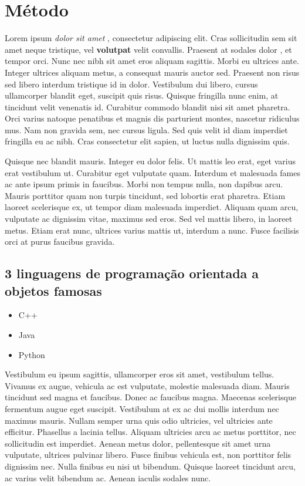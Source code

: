 \section{Método}
{ \LARGE 
    Lorem ipsum \textit{ dolor sit amet }
}, consectetur adipiscing elit. 
Cras sollicitudin sem sit amet neque tristique, vel \textbf{ volutpat } velit convallis. 
{ \footnotesize Praesent at sodales dolor }, et tempor orci. 
Nunc nec nibh sit { \Large amet eros } aliquam sagittis. 
{ \ttfamily
Morbi eu ultrices ante. Integer ultrices aliquam metus, a consequat mauris auctor sed.
}
Praesent non risus sed libero interdum tristique id in dolor. 
Vestibulum dui libero, cursus ullamcorper blandit eget, suscipit quis risus. 
Quisque fringilla nunc enim, at tincidunt velit venenatis id. 
Curabitur commodo blandit nisi sit amet pharetra. 
Orci varius natoque penatibus et magnis dis parturient montes, nascetur ridiculus mus. 
Nam non gravida sem, nec cursus ligula. Sed quis velit id diam imperdiet fringilla eu ac nibh. 
Cras consectetur elit sapien, ut luctus nulla dignissim quis.

Quisque nec blandit mauris. Integer eu dolor felis. 
Ut mattis leo erat, eget varius erat vestibulum ut. 
Curabitur eget vulputate quam. Interdum et malesuada fames ac ante ipsum primis in faucibus. 
Morbi non tempus nulla, non dapibus arcu. 
Mauris porttitor quam non turpis tincidunt, sed lobortis erat pharetra. 
Etiam laoreet scelerisque ex, ut tempor diam malesuada imperdiet. 
Aliquam quam arcu, vulputate ac dignissim vitae, maximus sed eros. 
Sed vel mattis libero, in laoreet metus. 
Etiam erat nunc, ultrices varius mattis ut, interdum a nunc. 
Fusce facilisis orci at purus faucibus gravida.

\subsection*{3 linguagens de programação orientada a objetos famosas}
\begin{itemize}
    \item C++
    \item Java
    \item Python
\end{itemize}

Vestibulum eu ipsum sagittis, ullamcorper eros sit amet, vestibulum tellus. 
Vivamus ex augue, vehicula ac est vulputate, molestie malesuada diam. 
Mauris tincidunt sed magna et faucibus. Donec ac faucibus magna. 
Maecenas scelerisque fermentum augue eget suscipit. 
Vestibulum at ex ac dui mollis interdum nec maximus mauris. 
Nullam semper urna quis odio ultricies, vel ultricies ante efficitur. Phasellus a lacinia tellus. 
Aliquam ultricies arcu ac metus porttitor, nec sollicitudin est imperdiet. 
Aenean metus dolor, pellentesque sit amet urna vulputate, ultrices pulvinar libero. 
Fusce finibus vehicula est, non porttitor felis dignissim nec. 
Nulla finibus eu nisi ut bibendum. 
Quisque laoreet tincidunt arcu, ac varius velit bibendum ac. Aenean iaculis sodales nunc. 